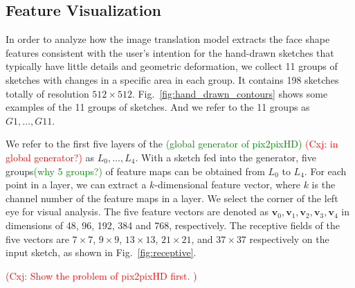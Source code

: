 \documentclass[10pt,twocolumn,letterpaper]{article}
\newcommand{\cxj}[1]{\textcolor{red}{(Cxj: #1)}}
\newcommand{\amend}[1]{\textcolor{green}{(#1)}}
\begin{document}
\subsection{Feature Visualization}\label{sec:visualize}



In order to analyze how the image translation model extracts the face shape features consistent with the user's intention for the hand-drawn sketches that typically have little details and geometric deformation, we collect 11 groups of sketches with changes in a specific area in each group. It contains 198 sketches totally of resolution $512\times512$. Fig.~\ref{fig:hand_drawn_contours} shows some examples of the 11 groups of sketches. And we refer to the 11 groups as $G1,\ldots,G11$.

We refer to the first five layers of the \amend{global generator of pix2pixHD} \cxj{in global generator?} as $L_0,\ldots,L_4$. 
With a sketch fed into the generator, five groups\amend{why 5 groups?} of feature maps can be obtained from $L_0$ to $L_4$.
For each point in a layer, we can extract a $k$-dimensional feature vector, where $k$ is the channel number of the feature maps in a layer.
We select the corner of the left eye for visual analysis. 
The five feature vectors are denoted as $\boldsymbol{v}_0,\boldsymbol{v}_1,\boldsymbol{v}_2,\boldsymbol{v}_3,\boldsymbol{v}_4$ in dimensions of 48, 96, 192, 384 and 768, respectively. 
The receptive fields of the five vectors are $7\times7$, $9\times9$, $13\times13$, $21\times21$, and $37\times37$ respectively on the input sketch, as shown in Fig.~\ref{fig:receptive}. 



\cxj{Show the problem of pix2pixHD first. }
\end{document}
